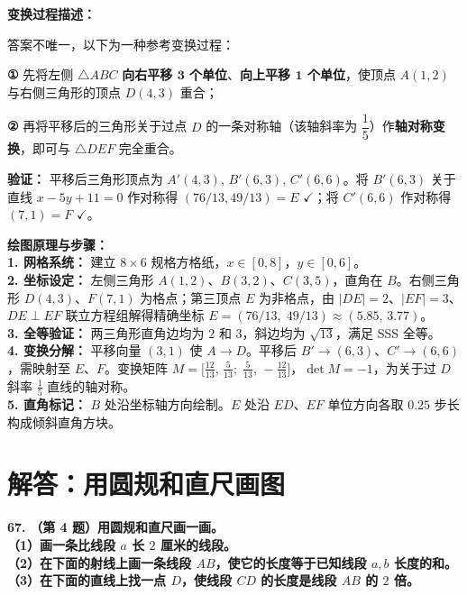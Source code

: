 \vspace{0.3cm}
\textbf{变换过程描述：}

答案不唯一，以下为一种参考变换过程：

\textbf{①} 先将左侧 $\triangle ABC$ \textbf{向右平移 $\mathbf{3}$ 个单位}、\textbf{向上平移 $\mathbf{1}$ 个单位}，使顶点 $A(1,2)$ 与右侧三角形的顶点 $D(4,3)$ 重合；

\textbf{②} 再将平移后的三角形关于过点 $D$ 的一条对称轴（该轴斜率为 $\dfrac{1}{5}$）作\textbf{轴对称变换}，即可与 $\triangle DEF$ 完全重合。

\vspace{0.2cm}
{\small
\textbf{验证：} 平移后三角形顶点为 $A'(4,3)$, $B'(6,3)$, $C'(6,6)$。将 $B'(6,3)$ 关于直线 $x - 5y + 11 = 0$ 作对称得 $(76/13, 49/13) = E$ $\checkmark$；将 $C'(6,6)$ 作对称得 $(7, 1) = F$ $\checkmark$。
}

\vspace{0.4cm}
{\small\color{blue!70!black}
\textbf{绘图原理与步骤：}\\
\textbf{1. 网格系统：} 建立 $8 \times 6$ 规格方格纸，$x \in [0,8]$，$y \in [0,6]$。\\
\textbf{2. 坐标设定：} 左侧三角形 $A(1,2)$、$B(3,2)、C(3,5)$，直角在 $B$。右侧三角形 $D(4,3)$、$F(7,1)$ 为格点；第三顶点 $E$ 为非格点，由 $|DE|=2、|EF|=3$、$DE \perp EF$ 联立方程组解得精确坐标 $E = (76/13,\; 49/13) \approx (5.85,\, 3.77)$。\\
\textbf{3. 全等验证：} 两三角形直角边均为 $2$ 和 $3$，斜边均为 $\sqrt{13}$，满足 SSS 全等。\\
\textbf{4. 变换分解：} 平移向量 $(3,1)$ 使 $A \to D$。平移后 $B' \to (6,3)$、$C' \to (6,6)$，需映射至 $E$、$F$。变换矩阵 $M = \bigl[\frac{12}{13},\, \frac{5}{13};\; \frac{5}{13},\, {-}\frac{12}{13}\bigr]$，$\det M = -1$，为关于过 $D$ 斜率 $\frac{1}{5}$ 直线的轴对称。\\
\textbf{5. 直角标记：} $B$ 处沿坐标轴方向绘制。$E$ 处沿 $ED$、$EF$ 单位方向各取 $0.25$ 步长构成倾斜直角方块。
}





\section{解答：用圆规和直尺画图}

\vspace{0.6cm}

\textbf{\LARGE 67.} \textbf{（第 4 题）用圆规和直尺画一画。\\[1.5ex]
（1）画一条比线段 $a$ 长 $2$ 厘米的线段。\\[1ex]
（2）在下面的射线上画一条线段 $AB$，使它的长度等于已知线段 $a, b$ 长度的和。\\[1ex]
（3）在下面的直线上找一点 $D$，使线段 $CD$ 的长度是线段 $AB$ 的 $2$ 倍。}

